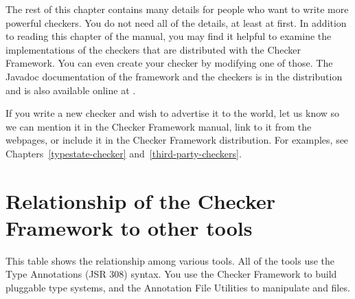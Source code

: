 The rest of this chapter contains many details for people who want to write more powerful
checkers.
You do not need all of the details, at least at first.
In addition to reading this chapter of the manual, you may find it helpful
to examine the implementations of the checkers that are distributed with
the Checker Framework.  You can even create your checker by modifying one
of those.
The Javadoc documentation of the framework and the checkers is in the
distribution and is also available online at
.

If you write a new checker and wish to advertise it to the world, let us
know so we can mention it in the Checker Framework manual, link to
it from the webpages, or include it in the Checker Framework distribution.
For examples, see Chapters~\ref{typestate-checker}
and~\ref{third-party-checkers}.


\section{Relationship of the Checker Framework to other tools\label{tool-relationships}}

This table shows the relationship among various tools.
All of the tools use the Type Annotations (JSR 308) syntax.
You use the Checker Framework to build pluggable type systems, and the
Annotation File Utilities to manipulate  and  files.

\newlength{\bw}
\setlength{\bw}{.5in}


